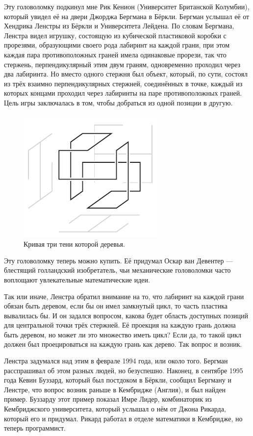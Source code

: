 Эту головоломку подкинул мне Рик Кенион (Университет Британской Колумбии), который увидел её на двери Джорджа Бергмана в Бёркли. 
Бергман услышал её от Хендрика Ленстры из Бёркли и Университета Лейдена.
По словам Бергмана, Ленстра видел игрушку, состоящую из кубической пластиковой коробки с прорезями, образующими своего рода лабиринт на каждой грани, при этом каждая пара противоположных граней имела одинаковые прорези, так что стержень, перпендикулярный этим двум граням, одновременно проходил через два лабиринта.
Но вместо одного стержня был объект, который, по сути, состоял из трёх взаимно перпендикулярных стержней, соединённых в точке, каждый из которых концами проходил через лабиринты на паре противоположных граней.
Цель игры заключалась в том, чтобы добраться из одной позиции в другую.

\begin{figure}[htb!]
\centering
\includegraphics[scale=1]{pics/tree3}
\caption{Кривая три тени которой деревья.}
\label{pic:tree3}
\end{figure}

Эту головоломку теперь можно купить.
Её придумал Оскар ван Девентер --- блестящий голландский изобретатель, чьи механические головоломки часто воплощают увлекательные математические идеи.

Так или иначе, Ленстра обратил внимание на то, что лабиринт на каждой грани обязан быть деревом,
если бы он имел замкнутый цикл, то часть пластика вывалилась бы.
И он задался вопросом, какова будет область доступных позиций для центральной точки трёх стержней.
Её проекция на каждую грань должна быть деревом, но может ли это множество иметь цикл?
Если да, то такой цикл должен был проецироваться на каждую грань как дерево.
Так вопрос и возник.

Ленстра задумался над этим в феврале 1994 года, или около того.
Бергман расспрашивал об этом разных людей, но безуспешно.
Наконец, в сентябре 1995 года Кевин Буззард, который был постдоком в Бёркли, сообщил Бергману и Ленстре, что вопрос возник раньше в Кембридже (Англия), и был найден пример.
Буззарду этот пример показал Имре Лидер, комбинаторик из Кембриджского университета, который услышал о нём от Джона Рикарда, который его и придумал.
Рикард работал в отделе математики в Кембридже, но теперь программист.

